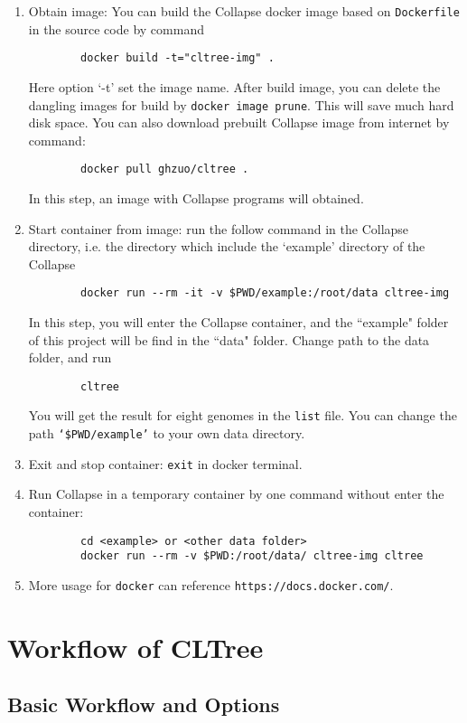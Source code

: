 \documentclass[12pt,a4paper]{article}
\begin{document}
\begin{enumerate}
	\item Obtain image: You can build the Collapse docker image based on {\tt Dockerfile} in the source code by command \begin{verbatim}
		docker build -t="cltree-img" .
		\end{verbatim}
		Here option `-t' set the image name. After build image, you can delete the dangling images for build by {\tt docker image prune}. This will save much hard disk space. You can also download prebuilt Collapse image from internet by command: 
		\begin{verbatim}
		docker pull ghzuo/cltree .
		\end{verbatim} 
		In this step, an image with Collapse programs will obtained.
	\item Start container from image: run the follow command in the Collapse directory, i.e. the directory which include the `example' directory of the Collapse
		\begin{verbatim}
		docker run --rm -it -v $PWD/example:/root/data cltree-img
		\end{verbatim} 
		In this step, you will enter the Collapse container, and the ``example" folder of this project will be find in the ``data" folder. Change path to the data folder, and run 
		\begin{verbatim}
		cltree 
		\end{verbatim}
		You will get the result for eight genomes in the {\tt list} file. You can change the path {\tt `\$PWD/example'} to your own data directory.
	\item Exit and stop container: {\tt exit} in docker terminal.
	\item Run Collapse in a temporary container by one command without enter the container: 
		\begin{verbatim}
		cd <example> or <other data folder>
		docker run --rm -v $PWD:/root/data/ cltree-img cltree
		\end{verbatim} 
	\item More usage for {\tt docker} can reference {\tt https://docs.docker.com/}.
\end{enumerate}


\section{Workflow of CLTree}

\subsection{Basic Workflow and Options}
\end{document}
